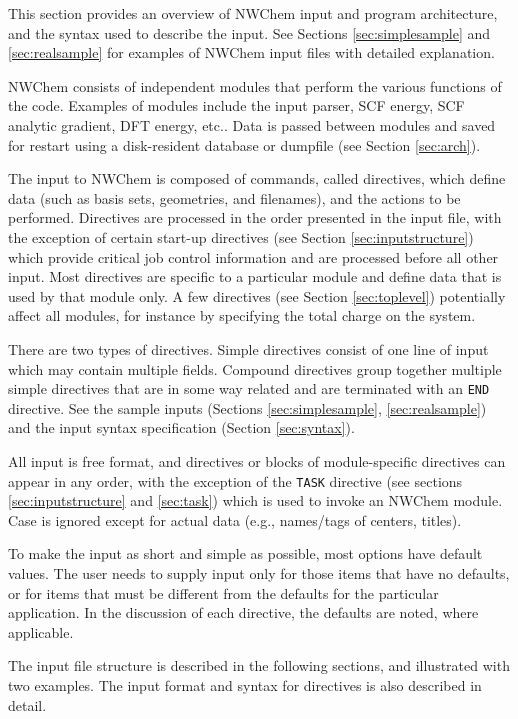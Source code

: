 \label{sec:getstart}

This section provides an overview of NWChem input and program
architecture, and the syntax used to describe the input.  See Sections
\ref{sec:simplesample} and \ref{sec:realsample} for examples of NWChem
input files with detailed explanation.

NWChem consists of independent modules that perform the various
functions of the code.  Examples of modules include the input parser,
SCF energy, SCF analytic gradient, DFT energy, etc..  Data is passed
between modules and saved for restart using a disk-resident database
or dumpfile (see Section \ref{sec:arch}).

The input to NWChem is composed of commands, called directives, which
define data (such as basis sets, geometries, and filenames), and the
actions to be performed.  Directives are processed in the order
presented in the input file, with the exception of certain start-up
directives (see Section \ref{sec:inputstructure}) which provide
critical job control information and are processed before all other
input.  Most directives are specific to a particular module and define
data that is used by that module only.  A few directives (see Section
\ref{sec:toplevel}) potentially affect all modules, for instance by
specifying the total charge on the system.  

There are two types of directives.  Simple directives consist of one
line of input which may contain multiple fields.  Compound directives
group together multiple simple directives that are in some way
related and are terminated with an \verb+END+ directive.  See the
sample inputs (Sections \ref{sec:simplesample}, \ref{sec:realsample})
and the input syntax specification (Section \ref{sec:syntax}).

All input is free format, and directives or blocks of module-specific
directives can appear in any order, with the exception of the
\verb+TASK+ directive (see sections \ref{sec:inputstructure} and
\ref{sec:task}) which is used to invoke an NWChem module.  Case is
ignored except for actual data (e.g., names/tags of centers, titles).

To make the input as short and simple as possible, most options have
default values.  The user needs to supply input only for those items that
have no defaults, or for items that must be different from the defaults
for the particular application.  In the discussion of each directive, the
defaults are noted, where applicable.

The input file structure is described in the following sections, and
illustrated with two examples.  The input format and syntax for directives
is also described in detail.

